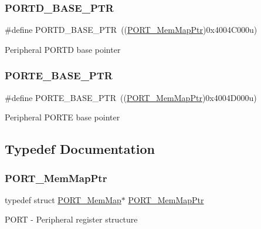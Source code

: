 \subsubsection{\texorpdfstring{P\+O\+R\+T\+D\+\_\+\+B\+A\+S\+E\+\_\+\+P\+TR}{PORTD\_BASE\_PTR}}
{\footnotesize\ttfamily \#define P\+O\+R\+T\+D\+\_\+\+B\+A\+S\+E\+\_\+\+P\+TR~((\hyperlink{group___p_o_r_t___peripheral_ga0e26bafb7c17808f90278627bcbcaf8c}{P\+O\+R\+T\+\_\+\+Mem\+Map\+Ptr})0x4004\+C000u)}

Peripheral P\+O\+R\+TD base pointer \mbox{\label{group___p_o_r_t___peripheral_gab166fe285bbb15b52de610f408fe25d3}} 
\subsubsection{\texorpdfstring{P\+O\+R\+T\+E\+\_\+\+B\+A\+S\+E\+\_\+\+P\+TR}{PORTE\_BASE\_PTR}}
{\footnotesize\ttfamily \#define P\+O\+R\+T\+E\+\_\+\+B\+A\+S\+E\+\_\+\+P\+TR~((\hyperlink{group___p_o_r_t___peripheral_ga0e26bafb7c17808f90278627bcbcaf8c}{P\+O\+R\+T\+\_\+\+Mem\+Map\+Ptr})0x4004\+D000u)}

Peripheral P\+O\+R\+TE base pointer 

\subsection{Typedef Documentation}
\mbox{\label{group___p_o_r_t___peripheral_ga0e26bafb7c17808f90278627bcbcaf8c}} 
\subsubsection{\texorpdfstring{P\+O\+R\+T\+\_\+\+Mem\+Map\+Ptr}{PORT\_MemMapPtr}}
{\footnotesize\ttfamily typedef struct \hyperlink{struct_p_o_r_t___mem_map}{P\+O\+R\+T\+\_\+\+Mem\+Map}$\ast$ \hyperlink{group___p_o_r_t___peripheral_ga0e26bafb7c17808f90278627bcbcaf8c}{P\+O\+R\+T\+\_\+\+Mem\+Map\+Ptr}}

P\+O\+RT -\/ Peripheral register structure 